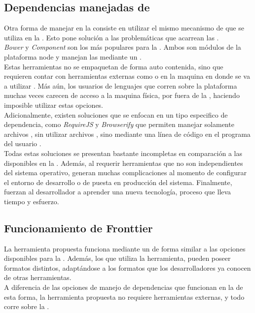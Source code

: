 \subsection{Dependencias manejadas de \viewtier}
\label{subsec:depmgmnt:jvm_dev:view_managed}

Otra forma de manejar \dependencies en la \viewtier consiste en utilizar el 
mismo mecanismo de \depmgrs que se utiliza en la \logictier. Esto pone solución 
a las problemáticas que acarrean las \cdns.\\
\emph{Bower} y \emph{Component} son los \depmgrs más populares para la 
\viewtier. Ambos son módulos de la plataforma \gls{node} y manejan las 
\dependencies mediante un \conffile.\\
Estas herramientas no se empaquetan de forma auto contenida, sino que requieren
contar con herramientas externas como \git o \svn en la maquina en donde se va a
utilizar . Más aún, los usuarios de lenguajes que corren 
sobre la plataforma \java muchas veces carecen de acceso a la maquina física, 
por fuera de la \jvm, haciendo imposible utilizar estas opciones.\\
Adicionalmente, existen soluciones que se enfocan en un tipo especifico de 
dependencia, como \emph{RequireJS} y \emph{Browserify} que permiten manejar 
solamente archivos \js, sin utilizar archivos \conffiles, sino mediante una 
línea de código en el programa del usuario .\\
Todas estas soluciones se presentan bastante incompletas en comparación a las
disponibles en la \viewtier. Además, al requerir herramientas que no son
independientes del sistema operativo, generan muchas complicaciones al momento
de configurar el entorno de desarrollo o de puesta en producción del sistema.
Finalmente, fuerzan al desarrollador a aprender una nueva tecnología, proceso
que lleva tiempo y esfuerzo.

\subsection{Funcionamiento de Fronttier}
\label{subsec:depmgmnt:proposal}

La herramienta propuesta funciona mediante un \conffile de forma similar a las
opciones disponibles para la \logictier. Además, los \conffile que utiliza la
herramienta, pueden poseer formatos distintos, adaptándose a los formatos que
los desarrolladores ya conocen de otras herramientas.\\
A diferencia de las opciones de manejo de dependencias que funcionan en la
\viewtier de esta forma, la herramienta propuesta no requiere herramientas
externas, y todo corre sobre la \jvm.